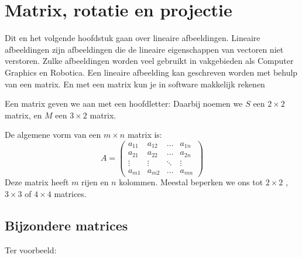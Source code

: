 \chapter{Matrix, rotatie en projectie}
\label{chap: matrix, rotatie en projectie}

Dit en het volgende hoofdstuk gaan over lineaire afbeeldingen. Lineaire afbeeldingen zijn afbeeldingen die de lineaire eigenschappen van  vectoren niet verstoren. Zulke afbeeldingen worden veel gebruikt in vakgebieden als Computer Graphics en Robotica. Een lineaire afbeelding kan geschreven worden met behulp van een matrix. En met een matrix kun je in software makkelijk rekenen

Een matrix geven we aan met een hoofdletter:
Daarbij noemen we $S$ een $ 2 \times 2 $ matrix, en $M$ een $ 3 \times 2 $ matrix. 

De algemene vorm van een $ m \times n $ matrix is:
$$
A = \begin{pmatrix}
    a_{11} &  a_{12}  & \ldots & a_{1n}\\
    a_{21}  &  a_{22} & \ldots & a_{2n}\\
    \vdots & \vdots & \ddots & \vdots\\
    a_{m1}  &   a_{m2}       &\ldots & a_{mn}
\end{pmatrix}
$$
Deze matrix heeft $ m $ rijen en $ n $ kolommen. Meestal beperken we ons tot $ 2 \times 2 $ , \  $ 3 \times 3 $ of $ 4 \times 4 $ matrices.
\section{Bijzondere matrices}

Ter voorbeeld: 


